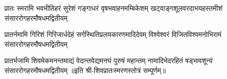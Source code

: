 
\fourlineindentedshloka
{प्रातः स्मरामि भवभीतिहरं सुरेशं}
{गङ्गाधरं वृषभवाहनमम्बिकेशम्‌}
{खट्वाङ्गशूलवरदाभयहस्तमीशं}
{संसाररोगहरमौषधमद्वितीयम्‌}

\fourlineindentedshloka
{प्रातर्नमामि गिरिशं गिरिजार्धदेहं}
{सर्गस्थितिप्रलयकारणमादिदेवम्‌}
{विश्वेश्वरं विजितविश्वमनोभिरामं}
{संसाररोगहरमौषधमद्वितीयम्‌}

\fourlineindentedshloka
{प्रातर्भजामि शिवमेकमनन्तमाद्यं}
{वेदान्तवेद्यमनघं पुरुषं महान्तम्‌}
{नामादिभेदरहितं षड्भावशून्यं}
{संसाररोगहरमौषधमद्वितीयम्‌}
॥इति श्री-शिवप्रातःस्मरणस्तोत्रं सम्पूर्णम्॥